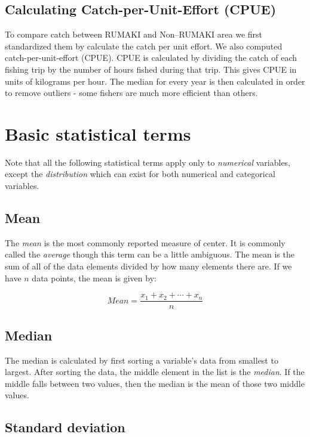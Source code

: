 \documentclass[
  12pt,
  a4paper,
  oneside]{book}
\begin{document}
\hypertarget{calculating-catch-per-unit-effort-cpue}{%
\section{Calculating Catch-per-Unit-Effort (CPUE)}\label{calculating-catch-per-unit-effort-cpue}}

To compare catch between RUMAKI and Non--RUMAKI area we first standardized them by calculate the catch per unit effort. We also computed catch-per-unit-effort (CPUE). CPUE is calculated by dividing the catch of each fishing trip by the number of hours fished during that trip. This gives CPUE in units of kilograms per hour. The median for every year is then calculated in order to remove outliers - some fishers are much more efficient than others.

\hypertarget{appendix-stat-terms}{%
\chapter{Basic statistical terms}\label{appendix-stat-terms}}

Note that all the following statistical terms apply only to \emph{numerical} variables, except the \emph{distribution} which can exist for both numerical and categorical variables.

\hypertarget{mean}{%
\section{Mean}\label{mean}}

The \emph{mean} is the most commonly reported measure of center. It is commonly called the \emph{average} though this term can be a little ambiguous. The mean is the sum of all of the data elements divided by how many elements there are. If we have \(n\) data points, the mean is given by:

\[Mean = \frac{x_1 + x_2 + \cdots + x_n}{n}\]

\hypertarget{median}{%
\section{Median}\label{median}}

The median is calculated by first sorting a variable's data from smallest to largest. After sorting the data, the middle element in the list is the \emph{median}. If the middle falls between two values, then the median is the mean of those two middle values.

\hypertarget{standard-deviation}{%
\section{Standard deviation}\label{standard-deviation}}
\end{document}
